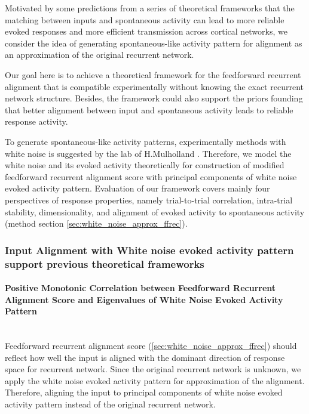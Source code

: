 \documentclass[11pt]{article}
\begin{document}
	Motivated by some predictions from a series of theoretical frameworks \cite{mulholland2023selective, marre2009reliable} that the matching between inputs and spontaneous activity can lead to more reliable evoked responses and more efficient transmission across cortical networks, we consider the idea of generating spontaneous-like activity pattern for alignment as an approximation of the original recurrent network. 
	
	Our goal here is to achieve a theoretical framework for the feedforward recurrent alignment that is compatible experimentally without knowing the exact recurrent network structure. Besides, the framework could also support the priors founding that better alignment between input and spontaneous activity leads to reliable response activity. 
	
	To generate spontaneous-like activity patterns, experimentally methods with white noise is suggested by the lab of H.Mulholland \cite{cosyne2023}.  %
	Therefore, we model the white noise and its evoked activity theoretically for construction of modified feedforward recurrent alignment score with principal components of white noise evoked activity pattern. Evaluation of our framework covers mainly four perspectives of response properties, namely trial-to-trial correlation, intra-trial stability, dimensionality, and alignment of evoked activity to spontaneous activity (method section \ref{sec:white_noise_approx_ffrec}). 
	
	\subsubsection{Input Alignment with White noise evoked activity pattern support previous theoretical frameworks}
	
	\paragraph{Positive Monotonic Correlation between Feedforward Recurrent Alignment Score and Eigenvalues of White Noise Evoked Activity Pattern}\mbox{}\\
	
	Feedforward recurrent alignment score (\ref{sec:white_noise_approx_ffrec}) should reflect how well the input is aligned with the dominant direction of response space for recurrent network. Since the original recurrent network is unknown, we apply the white noise evoked activity pattern for approximation of the alignment. Therefore, aligning the input to principal components of white noise evoked activity pattern instead of the original recurrent network. 
	
\end{document}
